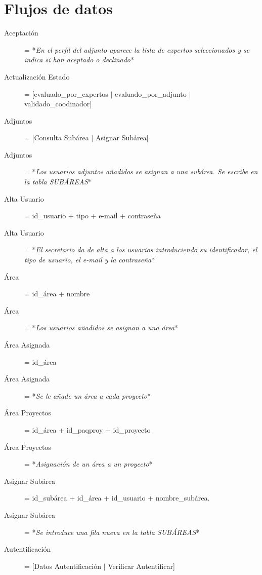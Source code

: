 \documentclass[12pt,a4paper,titlepage,spanish,twoside]{book}
\begin{document}
\section{Flujos de datos}
\begin{description}
\item[Aceptación] = *\emph{En el perfil del adjunto aparece la lista de
    expertos seleccionados y se indica si han aceptado o declinado}* 

\item[Actualización Estado] = [evaluado\_por\_expertos $\mid$
  evaluado\_por\_adjunto $\mid$ validado\_coodinador] 

\item[Adjuntos] = [Consulta Subárea $\mid$ Asignar Subárea]

\item[Adjuntos] = *\emph{Los usuarios adjuntos añadidos se asignan a una
    subárea. Se escribe en la tabla SUBÁREAS}* 
 
\item[Alta Usuario] = id\_usuario + tipo + e-mail + contraseña

\item[Alta Usuario] = *\emph{El secretario da de alta a los usuarios
    introduciendo su identificador, el tipo de usuario, el e-mail y la
    contraseña}* 

\item[Área] = id\_área + nombre

\item[Área] = *\emph{Los usuarios añadidos se asignan a una área}*

\item[Área Asignada] = id\_área

\item[Área Asignada] = *\emph{Se le añade un área a cada proyecto}*

\item[Área Proyectos] = id\_área + id\_paqproy + id\_proyecto

\item[Área Proyectos] = *\emph{Asignación de un área a un proyecto}*

\item[Asignar Subárea] = id\_subárea + id\_área + id\_usuario + nombre\_subárea.

\item[Asignar Subárea] = *\emph{Se introduce una fila nueva en la tabla
    SUBÁREAS}* 

\item[Autentificación] = [Datos Autentificación $\mid$ Verificar Autentificar]


\end{description}
\end{document}
